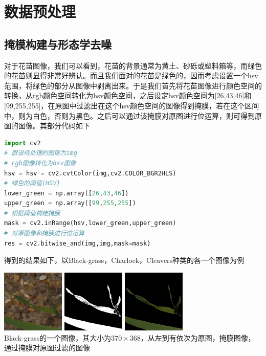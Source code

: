 \section{数据预处理}
\subsection{掩模构建与形态学去噪}
对于花苗图像，我们可以看到，花苗的背景通常为黄土、砂砾或塑料箱等，而绿色的花苗则显得非常好辨认。而且我们面对的花苗是绿色的，因而考虑设置一个hsv范围，将绿色的部分从图像中剥离出来。于是我们首先将花苗图像进行颜色空间的转换，从rgb颜色空间转化为hsv颜色空间，之后设定hsv颜色空间为[26,43,46]和[99,255,255]，在原图中过滤出在这个hsv颜色空间的图像得到掩膜，若在这个区间中，则为白色，否则为黑色。之后可以通过该掩膜对原图进行位运算，则可得到原图的图像。其部分代码如下
\begin{lstlisting}[language=python]
import cv2
# 假设待处理的图像为img
# rgb图像转化为hsv图像
hsv = hsv = cv2.cvtColor(img,cv2.COLOR_BGR2HLS)
# 绿色的阈值(HSV)
lower_green = np.array([26,43,46])
upper_green = np.array([99,255,255])
# 根据阈值构建掩膜
mask = cv2.inRange(hsv,lower_green,upper_green)
# 对原图像和掩膜进行位运算
res = cv2.bitwise_and(img,img,mask=mask)
\end{lstlisting}
得到的结果如下，以Black-grass，Charlock，Cleavers种类的各一个图像为例
\begin{center}
\includegraphics[width=30mm,height=30mm]{../figures/Black-grass_1af1eddd3.png} 
\includegraphics[width=30mm,height=30mm]{../figures/Black-grass_1af1eddd3_mask.png} 	
\includegraphics[width=30mm,height=30mm]{../figures/Black-grass_1af1eddd3_res.png} 	\\
Black-grass的一个图像，其大小为$370\times 368$，从左到有依次为原图，掩膜图像，通过掩膜对原图过滤的图像
\end{center}
